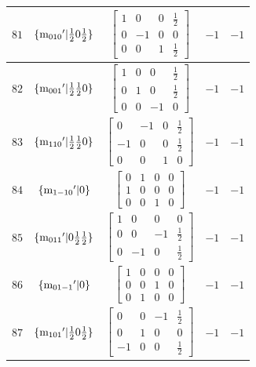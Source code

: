 \documentclass[fleqn,8pt]{jsarticle}
\begin{document}
\begin{longtable}{ccccc}
$ 81 $ & $ \{{\rm m}_{010}{}'|\frac{1}{2} 0 \frac{1}{2}\} $ & $ \begin{bmatrix} 1 & 0 & 0 & \frac{1}{2} \\ 0 & -1 & 0 & 0 \\ 0 & 0 & 1 & \frac{1}{2} \end{bmatrix} $ & $ -1 $ & $ -1 $ \\ \hline
$ 82 $ & $ \{{\rm m}_{001}{}'|\frac{1}{2} \frac{1}{2} 0\} $ & $ \begin{bmatrix} 1 & 0 & 0 & \frac{1}{2} \\ 0 & 1 & 0 & \frac{1}{2} \\ 0 & 0 & -1 & 0 \end{bmatrix} $ & $ -1 $ & $ -1 $ \\ \hline
$ 83 $ & $ \{{\rm m}_{110}{}'|\frac{1}{2} \frac{1}{2} 0\} $ & $ \begin{bmatrix} 0 & -1 & 0 & \frac{1}{2} \\ -1 & 0 & 0 & \frac{1}{2} \\ 0 & 0 & 1 & 0 \end{bmatrix} $ & $ -1 $ & $ -1 $ \\ \hline
$ 84 $ & $ \{{\rm m}_{1-10}{}'|0\} $ & $ \begin{bmatrix} 0 & 1 & 0 & 0 \\ 1 & 0 & 0 & 0 \\ 0 & 0 & 1 & 0 \end{bmatrix} $ & $ -1 $ & $ -1 $ \\ \hline
$ 85 $ & $ \{{\rm m}_{011}{}'|0 \frac{1}{2} \frac{1}{2}\} $ & $ \begin{bmatrix} 1 & 0 & 0 & 0 \\ 0 & 0 & -1 & \frac{1}{2} \\ 0 & -1 & 0 & \frac{1}{2} \end{bmatrix} $ & $ -1 $ & $ -1 $ \\ \hline
$ 86 $ & $ \{{\rm m}_{01-1}{}'|0\} $ & $ \begin{bmatrix} 1 & 0 & 0 & 0 \\ 0 & 0 & 1 & 0 \\ 0 & 1 & 0 & 0 \end{bmatrix} $ & $ -1 $ & $ -1 $ \\ \hline
$ 87 $ & $ \{{\rm m}_{101}{}'|\frac{1}{2} 0 \frac{1}{2}\} $ & $ \begin{bmatrix} 0 & 0 & -1 & \frac{1}{2} \\ 0 & 1 & 0 & 0 \\ -1 & 0 & 0 & \frac{1}{2} \end{bmatrix} $ & $ -1 $ & $ -1 $ \\ \hline

\end{longtable}
\end{document}
